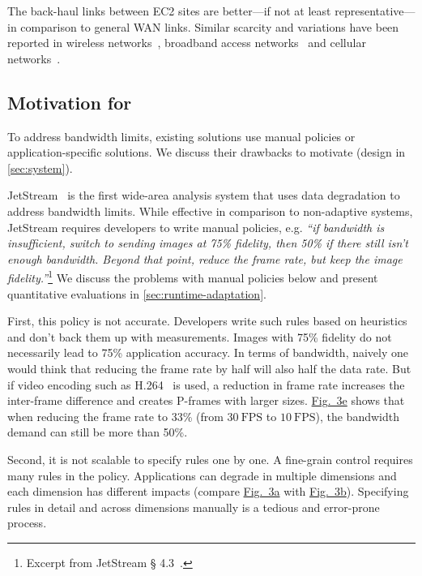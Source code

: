The back-haul links between EC2 sites are better---if not at least
representative---in comparison to general WAN links. Similar scarcity and
variations have been reported in wireless networks~\cite{biswas2015large},
broadband access networks~\cite{grover2013peeking, sundaresan2014bismark} and
cellular networks~\cite{nikravesh2014mobile}.

\subsection{Motivation for \sysname{}}
\label{subsec:motivation}

To address bandwidth limits, existing solutions use manual policies or
application-specific solutions. We discuss their drawbacks to motivate
\sysname{} (design in \autoref{sec:system}).

 JetStream~\cite{rabkin2014aggregation} is
the first wide-area analysis system that uses data degradation to address
bandwidth limits. While effective in comparison to non-adaptive systems,
JetStream requires developers to write manual policies, e.g. \textit{``if
  bandwidth is insufficient, switch to sending images at 75\% fidelity, then
  50\% if there still isn't enough bandwidth. Beyond that point, reduce the
  frame rate, but keep the image fidelity.''}\footnote{Excerpt from JetStream \S
  4.3~\cite{rabkin2014aggregation}.} We discuss the problems with manual
policies below and present quantitative evaluations in
\autoref{sec:runtime-adaptation}.

First, this policy is not accurate.  Developers write such rules based on
heuristics and don't back them up with measurements. Images with 75\% fidelity
do not necessarily lead to 75\% application accuracy. In terms of bandwidth,
naively one would think that reducing the frame rate by half will also half the
data rate. But if video encoding such as H.264~\cite{richardson2011h} is used, a
reduction in frame rate increases the inter-frame difference and creates
P-frames with larger sizes. \hyperref[fig:app-specific]{Fig.~3e} shows that when
reducing the frame rate to 33\% (from \(30~\text{FPS}\) to \(10~\text{FPS}\)),
the bandwidth demand can still be more than 50\%.

Second, it is not scalable to specify rules one by one. A fine-grain control
requires many rules in the policy. Applications can degrade in multiple
dimensions and each dimension has different impacts (compare
\hyperref[fig:app-specific]{Fig.~3a} with \hyperref[fig:app-specific]{Fig.~3b}).
Specifying rules in detail and across dimensions manually is a tedious and
error-prone process.

